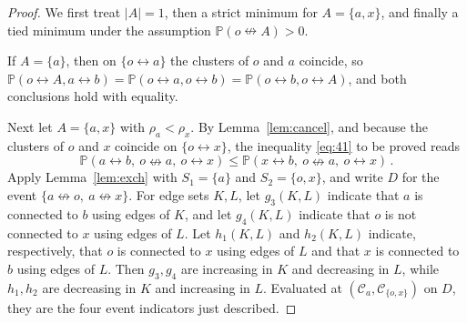 \documentclass[11pt]{article}
\theoremstyle{definition}
\theoremstyle{remark}
\newcommand{\PP}{\mathbb P}
\newcommand{\con}{\leftrightarrow}
\newcommand{\ncon}{\nleftrightarrow}
\newcommand{\eC}{\mathcal C}
\begin{document}
\begin{proof}
We first treat $|A|=1$, then a strict minimum for $A=\{a,x\}$, and finally a tied minimum
under the assumption $\PP(o\ncon A)>0$.

If $A=\{a\}$, then on $\{o\con a\}$ the clusters of $o$ and $a$ coincide, so $\PP(o\con
A,a\con b)=\PP(o\con a,o\con b)=\PP(o\con b,o\con A)$, and both conclusions hold with
equality.

Next let $A=\{a,x\}$ with $\rho_a<\rho_x$. By Lemma~\ref{lem:cancel}, and because the
clusters of $o$ and $x$ coincide on $\{o\con x\}$, the inequality \eqref{eq:41} to be
proved reads
\begin{equation}\label{eq:q8target}
 \PP(a\con b,\ o\ncon a,\ o\con x)\leq \PP(x\con b,\ o\ncon a,\ o\con x)\,.
\end{equation}
Apply Lemma~\ref{lem:exch} with $S_1=\{a\}$ and $S_2=\{o,x\}$, and write $D$ for the event
$\{a\ncon o,\ a\ncon x\}$. For edge sets $K,L$, let $g_3(K,L)$ indicate that $a$ is
connected to $b$ using edges of $K$, and let $g_4(K,L)$ indicate that $o$ is not connected
to $x$ using edges of $L$. Let $h_1(K,L)$ and $h_2(K,L)$ indicate, respectively, that $o$ is
connected to $x$ using edges of $L$ and that $x$ is connected to $b$ using edges of $L$. Then $g_3,g_4$ are
increasing in $K$ and decreasing in $L$, while $h_1,h_2$ are decreasing in $K$ and
increasing in $L$. Evaluated at $(\eC_a,\eC_{\{o,x\}})$ on $D$, they are the four event
indicators just described.


\end{proof}
\end{document}
